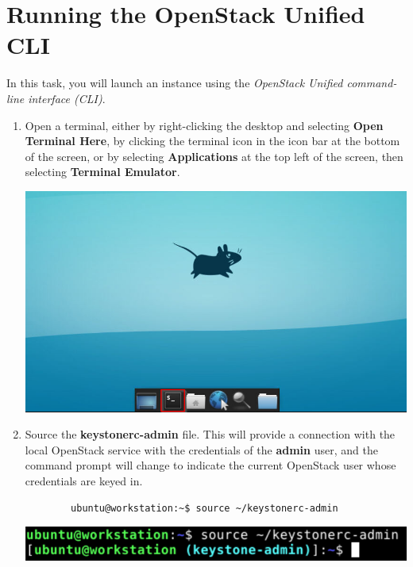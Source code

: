 \documentclass[letterpaper, 12pt]{article}
\begin{document}
\section{Running the OpenStack Unified CLI}
In this task, you will launch an instance using the \textit{OpenStack Unified command-line interface (CLI)}.

\begin{enumerate}
    \item Open a terminal, either by right-clicking the desktop and selecting \textbf{Open Terminal Here}, by clicking the terminal icon in the icon bar at the bottom of the screen, or by selecting \textbf{Applications} at the top left of the screen, then selecting \textbf{Terminal Emulator}.

    \begin{center}
        \includegraphics[width=\linewidth]{images/part2/step1.png}
    \end{center}

    \item Source the \textbf{keystonerc-admin} file. This will provide a connection with the local OpenStack service with the credentials of the \textbf{admin} user, and the command prompt will change to indicate the current OpenStack user whose credentials are keyed in.
    \begin{lstlisting}
        ubuntu@workstation:~$ source ~/keystonerc-admin
    \end{lstlisting}

    \begin{center}
        \includegraphics[width=\linewidth]{images/part2/step2.png}
    \end{center}


\end{enumerate}
\end{document}
